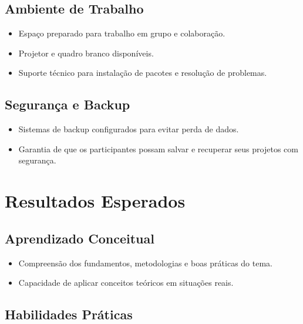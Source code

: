 \documentclass[
  letterpaper,
  DIV=11,
  numbers=noendperiod]{scrreprt}
\providecommand{\tightlist}{%
  \setlength{\itemsep}{0pt}\setlength{\parskip}{0pt}}
\begin{document}
\subsection{Ambiente de Trabalho}\label{ambiente-de-trabalho}

\begin{itemize}
\tightlist
\item
  Espaço preparado para trabalho em grupo e colaboração.\\
\item
  Projetor e quadro branco disponíveis.\\
\item
  Suporte técnico para instalação de pacotes e resolução de problemas.
\end{itemize}

\subsection{Segurança e Backup}\label{seguranuxe7a-e-backup}

\begin{itemize}
\tightlist
\item
  Sistemas de backup configurados para evitar perda de dados.\\
\item
  Garantia de que os participantes possam salvar e recuperar seus
  projetos com segurança.
\end{itemize}

\section{Resultados Esperados}\label{resultados-esperados}

\subsection{Aprendizado Conceitual}\label{aprendizado-conceitual}

\begin{itemize}
\tightlist
\item
  Compreensão dos fundamentos, metodologias e boas práticas do tema.\\
\item
  Capacidade de aplicar conceitos teóricos em situações reais.
\end{itemize}

\subsection{Habilidades Práticas}\label{habilidades-pruxe1ticas}
\end{document}
